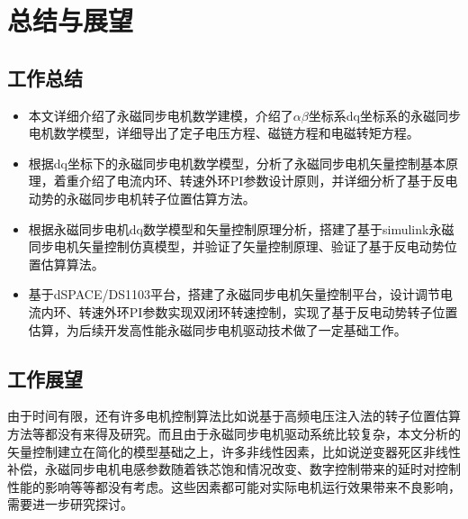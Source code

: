 \chapter{总结与展望}
\section{工作总结}
\begin{itemize}

\item 本文详细介绍了永磁同步电机数学建模，介绍了$\alpha\beta$坐标系dq坐标系的永磁同步电机数学模型，详细导出了定子电压方程、磁链方程和电磁转矩方程。
\item 根据dq坐标下的永磁同步电机数学模型，分析了永磁同步电机矢量控制基本原理，着重介绍了电流内环、转速外环PI参数设计原则，并详细分析了基于反电动势的永磁同步电机转子位置估算方法。
\item 根据永磁同步电机dq数学模型和矢量控制原理分析，搭建了基于simulink永磁同步电机矢量控制仿真模型，并验证了矢量控制原理、验证了基于反电动势位置估算算法。
\item 基于dSPACE/DS1103平台，搭建了永磁同步电机矢量控制平台，设计调节电流内环、转速外环PI参数实现双闭环转速控制，实现了基于反电动势转子位置估算，为后续开发高性能永磁同步电机驱动技术做了一定基础工作。
\end{itemize}
\section{工作展望}
由于时间有限，还有许多电机控制算法比如说基于高频电压注入法的转子位置估算方法等都没有来得及研究。而且由于永磁同步电机驱动系统比较复杂，本文分析的矢量控制建立在简化的模型基础之上，许多非线性因素，比如说逆变器死区非线性补偿，永磁同步电机电感参数随着铁芯饱和情况改变、数字控制带来的延时对控制性能的影响等等都没有考虑。这些因素都可能对实际电机运行效果带来不良影响，需要进一步研究探讨。





